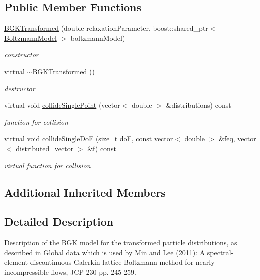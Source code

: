 \subsection*{Public Member Functions}
\begin{DoxyCompactItemize}
\item 
\hyperlink{classnatrium_1_1BGKTransformed_aafd0ed5b888da93e496c0a29e092bf5b}{B\-G\-K\-Transformed} (double relaxation\-Parameter, boost\-::shared\-\_\-ptr$<$ \hyperlink{classnatrium_1_1BoltzmannModel}{Boltzmann\-Model} $>$ boltzmann\-Model)
\begin{DoxyCompactList}\small\item\em constructor \end{DoxyCompactList}\item 
\hypertarget{classnatrium_1_1BGKTransformed_a554c68facfbd2b126f24504f215eb193}{virtual \hyperlink{classnatrium_1_1BGKTransformed_a554c68facfbd2b126f24504f215eb193}{$\sim$\-B\-G\-K\-Transformed} ()}\label{classnatrium_1_1BGKTransformed_a554c68facfbd2b126f24504f215eb193}

\begin{DoxyCompactList}\small\item\em destructor \end{DoxyCompactList}\item 
virtual void \hyperlink{classnatrium_1_1BGKTransformed_a2e40159e5f5204431b1acb84b15910c0}{collide\-Single\-Point} (vector$<$ double $>$ \&distributions) const 
\begin{DoxyCompactList}\small\item\em function for collision \end{DoxyCompactList}\item 
virtual void \hyperlink{classnatrium_1_1BGKTransformed_a9e04fc83b3c362febd4fc8e5060407e3}{collide\-Single\-Do\-F} (size\-\_\-t do\-F, const vector$<$ double $>$ \&feq, vector$<$ distributed\-\_\-vector $>$ \&f) const 
\begin{DoxyCompactList}\small\item\em virtual function for collision \end{DoxyCompactList}\end{DoxyCompactItemize}
\subsection*{Additional Inherited Members}


\subsection{Detailed Description}
Description of the B\-G\-K model for the transformed particle distributions, as described in Global data which is used by Min and Lee (2011)\-: A spectral-\/element discontinuous Galerkin lattice Boltzmann method for nearly incompressible flows, J\-C\-P 230 pp. 245-\/259. 

